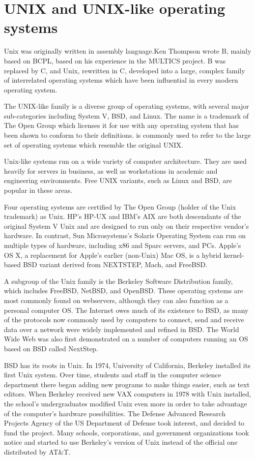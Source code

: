 \documentclass{full}
\begin{document}
\section*{UNIX and UNIX-like operating systems}
Unix was originally written in assembly language.Ken Thompson wrote B, mainly
based on BCPL, based on his experience in the MULTICS project. B was replaced by
C, and Unix, rewritten in C, developed into a large, complex family of
interrelated operating systems which have been influential in every modern
operating
system.

The UNIX-like family is a diverse group of operating systems, with several major
sub-categories including System V, BSD, and Linux. The name  is a
trademark of The Open Group which licenses it for use with any operating system
that has been shown to conform to their definitions.  is
commonly used to refer to the large set of operating systems which resemble the
original UNIX.

Unix-like systems run on a wide variety of computer architecture. They are used
heavily for servers in business, as well as workstations in academic and
engineering environments. Free UNIX variants, such as Linux and BSD, are popular
in these areas.

Four operating systems are certified by The Open Group (holder of the Unix
trademark) as Unix. HP's HP-UX and IBM's AIX are both descendants of the
original System V Unix and are designed to run only on their respective vendor's
hardware. In contrast, Sun Microsystems's Solaris Operating System can run on
multiple types of hardware, including x86 and Sparc servers, and PCs. Apple's OS
X, a replacement for Apple's earlier (non-Unix) Mac OS, is a hybrid kernel-based
BSD variant derived from NEXTSTEP, Mach, and FreeBSD.

A subgroup of the Unix family is the Berkeley Software Distribution family,
which includes FreeBSD, NetBSD, and OpenBSD. These operating systems are most
commonly found on webservers, although they can also function as a personal
computer OS. The Internet owes much of its existence to BSD, as many of the
protocols now commonly used by computers to connect, send and receive data over
a network were widely implemented and refined in BSD. The World Wide Web was
also first demonstrated on a number of computers running an OS based on BSD
called NextStep.

BSD has its roots in Unix. In 1974, University of California, Berkeley installed
its first Unix system. Over time, students and staff in the computer science
department there began adding new programs to make things easier, such as text
editors. When Berkeley received new VAX computers in 1978 with Unix installed,
the school's undergraduates modified Unix even more in order to take advantage
of the computer's hardware possibilities. The Defense Advanced Research Projects
Agency of the US Department of Defense took interest, and decided to fund the
project. Many schools, corporations, and government organizations took notice
and started to use Berkeley's version of Unix instead of the official one
distributed by AT\&T.
\end{document}
